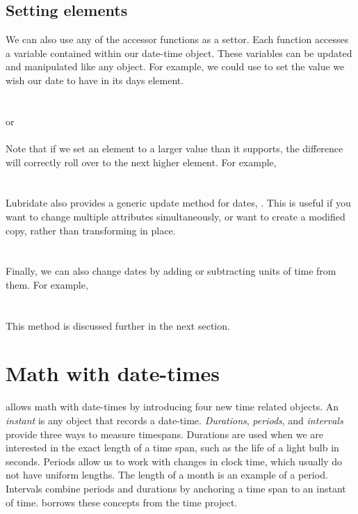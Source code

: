 \documentclass[article]{jss}
\begin{document}
\subsection{Setting elements}
We can also use any of the accessor functions as a settor. Each function accesses a variable contained within our date-time object. These variables can be updated and manipulated like any  object. For example, we could use  to set the value we wish our date to have in its days element.\\

\\
\\

or\\

\\

Note that if we set an element to a larger value than it supports, the difference will correctly roll over to the next higher element. For example,\\

\\
\\

Lubridate also provides a generic update method for dates, .  This is useful if you want to change multiple attributes simultaneously, or want to create a modified copy, rather than transforming in place.\\

\\
\\

Finally, we can also change dates by adding or subtracting units of time from them. For example,\\

\\
\\

This method is discussed further in the next section.


\section{Math with date-times}
\label{sec:types}
 allows math with date-times by introducing four new time related objects. An \emph{instant} is any object that records a date-time. \emph{Durations}, \emph{periods}, and \emph{intervals} provide three ways to measure timespans. Durations are used when we are interested in the exact length of a time span, such as the life of a light bulb in seconds. Periods allow us to work with changes in clock time, which usually do not have uniform lengths. The length of a month is an example of a period. Intervals combine periods and durations by anchoring a time span to an instant of time.  borrows these concepts from the  time project.
\end{document}
